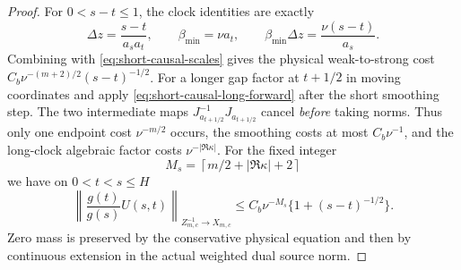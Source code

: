 \begin{proof}
For $0<s-t\le1$, the clock identities are exactly
\[
 \Delta z=\frac{s-t}{a_sa_t},\qquad
 \beta_{\min}=\nu a_t,\qquad
 \beta_{\min}\Delta z=\frac{\nu(s-t)}{a_s}.
\]
Combining with \eqref{eq:short-causal-scales} gives the physical
weak-to-strong cost $C_b\nu^{-(m+2)/2}(s-t)^{-1/2}$.
For a longer gap factor at $t+1/2$ in moving coordinates and apply
\eqref{eq:short-causal-long-forward} after the short smoothing step.
The two intermediate maps $J_{a_{t+1/2}}^{-1}J_{a_{t+1/2}}$
cancel \emph{before} taking norms. Thus only one endpoint cost
$\nu^{-m/2}$ occurs, the smoothing costs at most $C_b\nu^{-1}$,
and the long-clock algebraic factor costs $\nu^{-|\Re\kappa|}$.
For the fixed integer
\[
 M_s=\left\lceil m/2+|\Re\kappa|+2\right\rceil
\]
we have on $0<t<s\le H$
\begin{equation}\label{eq:short-causal-weak-forward}
 \left\|\frac{g(t)}{g(s)}U(s,t)\right\|_{Z^{-1}_{m,c}\to X_{m,c}}
 \le C_b\nu^{-M_s}\{1+(s-t)^{-1/2}\}.
\end{equation}
Zero mass is preserved by the conservative physical equation and
then by continuous extension in the actual weighted dual source norm.

\end{proof}
